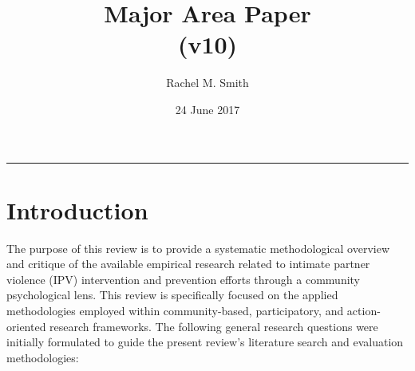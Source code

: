 \documentclass[11pt,]{tufte-book}
\title{Major Area Paper\\
(v10)}
\author{Rachel M. Smith}
\date{24 June 2017}
\newcommand{\Frule}{
    \vspace*{-1em}
    \begin{fullwidth}\textcolor{blublk}{\rule{\linewidth}{0.2mm}}\end{fullwidth}
}
\begin{document}
\maketitle



{
\setcounter{tocdepth}{1}
\tableofcontents
}

\makeatletter
\def\LT@makenoprefixcaption#1#2#3{%
  \LT@mcol\LT@cols c{\hbox to\z@{\hss\parbox[t]\LTcapwidth{
    \sbox\@tempboxa{#1{}#3}
    \ifdim\wd\@tempboxa>\hsize
      #1{}#3
    \else
      \hbox to\hsize{\hfil\box\@tempboxa\hfil}%
    \fi
    \endgraf\vskip\baselineskip}
  \hss}}}
\makeatother

\makeatletter
\let\LT@oldmakecaption=\LT@makecaption
\let\oldthetable=\thetable
\let\oldtheHtable=\theHtable
\makeatother

\makeatletter
{}
\newenvironment{no-prefix-table-caption}{
  \let\LT@makecaption=\LT@makenoprefixcaption
  \renewcommand\thetable{x.\thetableno}
  \renewcommand\theHtable{x.\thetableno}
  \stepcounter{tableno}
}{
  \let\thetable=\oldthetable
  \let\theHtable=\oldtheHtable
  \let\LT@makecaption=\LT@oldmakecaption
  \addtocounter{table}{-1}
}
\makeatother

\newcommand{\plusnamesingular}{}
\newcommand{\starnamesingular}{}
\newcommand{\xrefname}[1]{\protect\renewcommand{\plusnamesingular}{#1}}
\newcommand{\Xrefname}[1]{\protect\renewcommand{\starnamesingular}{#1}}
\providecommand{\cref}{\plusnamesingular~\ref}
\providecommand{\Cref}{\starnamesingular~\ref}
\providecommand{\crefformat}[2]{}
\providecommand{\Crefformat}[2]{}

\crefformat{figure}{Figure~#2#1#3}
\Crefformat{figure}{Figure~#2#1#3}
\crefformat{table}{Table~#2#1#3}
\Crefformat{table}{Table~#2#1#3}

\Frule

\chapter{Introduction}\label{introduction}

The purpose of this review is to provide a systematic methodological
overview and critique of the available empirical research related to
intimate partner violence (IPV) intervention and prevention efforts
through a community psychological lens. This review is specifically
focused on the applied methodologies employed within community-based,
participatory, and action-oriented research frameworks. The following
general research questions were initially formulated to guide the
present review's literature search and evaluation methodologies:
\end{document}
